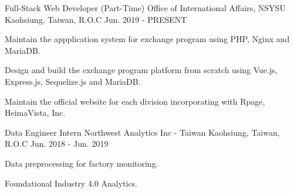 

\begin{cventries}

  \cventry
    {Full-Stack Web Developer (Part-Time)} %
    {Office of International Affairs, NSYSU} %
    {Kaohsiung, Taiwan, R.O.C} %
    {Jun. 2019 - PRESENT} %
    {
      \begin{cvitems} %
        \item {Maintain the appplication system for exchange program using PHP, Nginx and MariaDB.}
        \item {Design and build the exchange program platform from scratch using Vue.js, Express.js, Sequelize.js and MariaDB.}
        \item {Maintain the official website for each division incorporating with Rpage, HeimaVista, Inc.}
      \end{cvitems}
    }

  \cventry
    {Data Engineer Intern} %
    {Northwest Analytics Inc - Taiwan} %
    {Kaohsiung, Taiwan, R.O.C} %
    {Jun. 2018 - Jun. 2019} %
    {
      \begin{cvitems} %
        \item {Data preprocessing for factory monitoring.}
        \item {Foundational Industry 4.0 Analytics.}
      \end{cvitems}
    }

\end{cventries}
